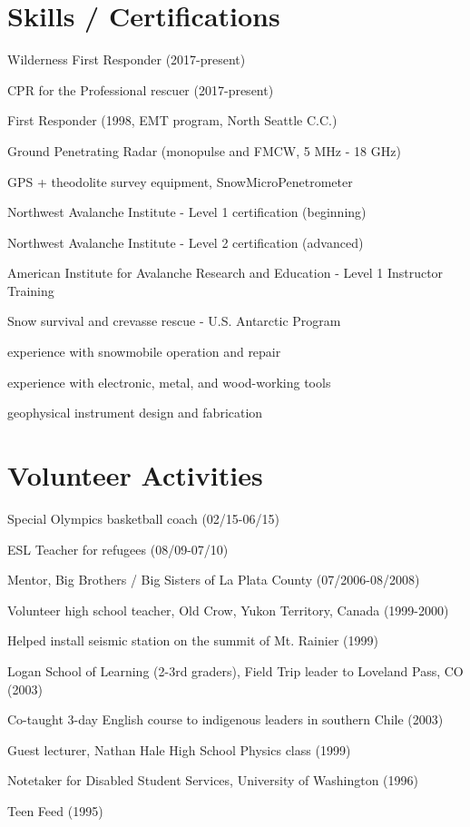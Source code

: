 \documentclass[11pt]{article}
\renewenvironment{itemize}{
  \begin{list}{}{
    \setlength{\leftmargin}{1.5em}
    \setlength{\itemsep}{0pt}
    \setlength{\parskip}{0pt}
  }
}{
  \end{list}
}
\begin{document}
\section*{Skills / Certifications}
\begin{itemize}
\item Wilderness First Responder (2017-present)
\item CPR for the Professional rescuer (2017-present)
\item First Responder (1998, EMT program, North Seattle C.C.)
\item Ground Penetrating Radar (monopulse and FMCW, 5 MHz - 18 GHz)
\item GPS + theodolite survey equipment, SnowMicroPenetrometer
\item Northwest Avalanche Institute - Level 1 certification (beginning)
\item Northwest Avalanche Institute - Level 2 certification (advanced)
\item American Institute for Avalanche Research and Education - Level 1 Instructor Training
\item Snow survival and crevasse rescue - U.S. Antarctic Program
\item experience with snowmobile operation and repair
\item experience with electronic, metal, and wood-working tools
\item geophysical instrument design and fabrication
\end{itemize}

\section*{Volunteer Activities}
\begin{itemize}
\item Special Olympics basketball coach (02/15-06/15)
\item ESL Teacher for refugees (08/09-07/10)
\item Mentor, Big Brothers / Big Sisters of La Plata County (07/2006-08/2008)
\item Volunteer high school teacher, Old Crow, Yukon Territory, Canada (1999-2000)
\item Helped install seismic station on the summit of Mt. Rainier (1999)
\item Logan School of Learning (2-3rd graders), Field Trip leader to Loveland Pass, CO (2003)
\item Co-taught 3-day English course to indigenous leaders in southern Chile (2003)
\item Guest lecturer, Nathan Hale High School Physics class (1999)
\item Notetaker for Disabled Student Services, University of Washington (1996)
\item Teen Feed (1995)
\end{itemize}
\end{document}
